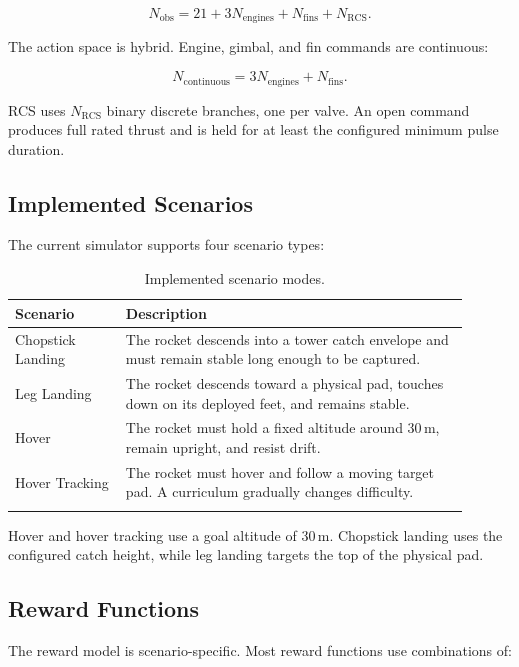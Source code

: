 \documentclass{article}
\begin{document}
\begin{equation}
N_{\mathrm{obs}} = 21 + 3N_{\mathrm{engines}} + N_{\mathrm{fins}} + N_{\mathrm{RCS}}.
\end{equation}

The action space is hybrid. Engine, gimbal, and fin commands are continuous:

\begin{equation}
N_{\mathrm{continuous}} = 3N_{\mathrm{engines}} + N_{\mathrm{fins}}.
\end{equation}

RCS uses \(N_{\mathrm{RCS}}\) binary discrete branches, one per valve. An open command produces full rated thrust and is held for at least the configured minimum pulse duration.

\subsection{Implemented Scenarios}

The current simulator supports four scenario types:

\begin{longtable}{p{0.22\linewidth} p{0.68\linewidth}}
\toprule
\textbf{Scenario} & \textbf{Description} \\
\midrule
\endhead
Chopstick Landing & The rocket descends into a tower catch envelope and must remain stable long enough to be captured. \\
Leg Landing & The rocket descends toward a physical pad, touches down on its deployed feet, and remains stable. \\
Hover & The rocket must hold a fixed altitude around \(30\,\mathrm{m}\), remain upright, and resist drift. \\
Hover Tracking & The rocket must hover and follow a moving target pad. A curriculum gradually changes difficulty. \\
\bottomrule
\caption{Implemented scenario modes.}
\end{longtable}

Hover and hover tracking use a goal altitude of \(30\,\mathrm{m}\). Chopstick landing uses the configured catch height, while leg landing targets the top of the physical pad.

\subsection{Reward Functions}

The reward model is scenario-specific. Most reward functions use combinations of:
\end{document}
